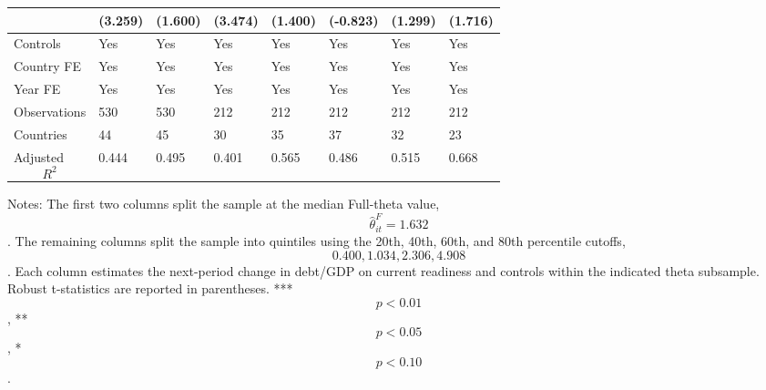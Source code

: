\begin{table}[H]
\begin{threeparttable}
\begin{tabularx}{\textwidth}{lYYYYYYY}
  & (3.259) & (1.600) & (3.474) & (1.400) & (-0.823) & (1.299) & (1.716) \\
\midrule
Controls & Yes & Yes & Yes & Yes & Yes & Yes & Yes \\
Country FE & Yes & Yes & Yes & Yes & Yes & Yes & Yes \\
Year FE & Yes & Yes & Yes & Yes & Yes & Yes & Yes \\
Observations & 530 & 530 & 212 & 212 & 212 & 212 & 212 \\
Countries & 44 & 45 & 30 & 35 & 37 & 32 & 23 \\
Adjusted $$R^2$$ & 0.444 & 0.495 & 0.401 & 0.565 & 0.486 & 0.515 & 0.668 \\
\bottomrule
\end{tabularx}
\begin{tablenotes}[flushleft]\footnotesize
\item Notes: The first two columns split the sample at the median Full-theta value, $$\widehat{\theta}^{F}_{it}=1.632$$. The remaining columns split the sample into quintiles using the 20th, 40th, 60th, and 80th percentile cutoffs, $$0.400, 1.034, 2.306, 4.908$$. Each column estimates the next-period change in debt/GDP on current readiness and controls within the indicated theta subsample. Robust t-statistics are reported in parentheses. *** $$p<0.01$$, ** $$p<0.05$$, * $$p<0.10$$.
\end{tablenotes}
\end{threeparttable}
\end{table}
